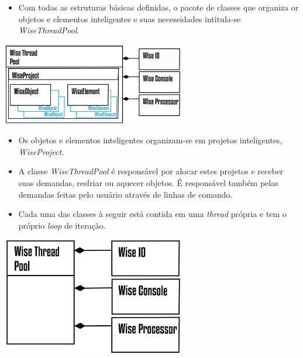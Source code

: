 \documentclass[10pt,aspectratio=169]{beamer}
\theoremstyle{remark}
\theoremstyle{definition}
\begin{document}
\begin{frame}[allowframebreaks]
			\begin{itemize}
					\item Com todas as estruturas básicas definidas, o pacote de classes que organiza or objetos e elementos inteligentes e suas necessidades intitula-se \textit{WiseThreadPool}.
			\end{itemize}		
		
		\begin{center}
			
			\item \includegraphics[width=0.6\textwidth]{Figures/WiseThreadPool@16x.png}
			
		\end{center}
		
		\framebreak
		
		\begin{itemize}
			\item Os objetos e elementos inteligentes organizam-se em projetos inteligentes, \textit{WiseProject}.
			\item A classe \textit{WiseThreadPool} é responsável por alocar estes projetos e receber suas demandas, resfriar ou aquecer objetos. É responsável também pelas demandas feitas pelo usuário através de linhas de comando.
		\end{itemize}
		
		\framebreak
		
	\begin{itemize}
			\item Cada uma das classes à seguir está contida em uma \textit{thread} própria e tem o próprio \textit{loop} de iteração.
		\end{itemize}		
		
		\begin{center}
			
			\item \includegraphics[width=0.6\textwidth]{Figures/WiseThreadPool2@16x.png}
			

\end{center}
\end{frame}
\end{document}
